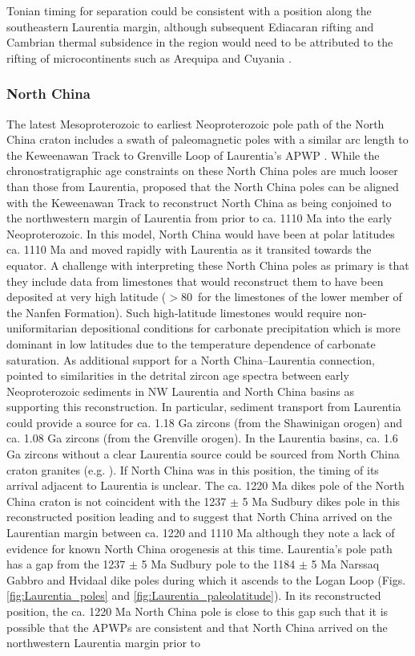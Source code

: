 \documentclass[twocolumn, switch]{article} %
\begin{document}
Tonian timing for separation could be consistent with a position along the southeastern Laurentia margin, although subsequent Ediacaran rifting and Cambrian thermal subsidence in the region would need to be attributed to the rifting of microcontinents such as Arequipa and Cuyania \citep{Escayola2011a, Martin2019a}.

\subsubsection{North China}

The latest Mesoproterozoic to earliest Neoproterozoic pole path of the North China craton includes a swath of paleomagnetic poles with a similar arc length to the Keweenawan Track to Grenville Loop of Laurentia's APWP \citep{Zhao2019a, Ding2021a, Zhang2021a}. While the chronostratigraphic age constraints on these North China poles are much looser than those from Laurentia, \cite{Zhao2019a} proposed that the North China poles can be aligned with the Keweenawan Track to reconstruct North China as being conjoined to the northwestern margin of Laurentia from prior to ca. 1110 Ma into the early Neoproterozoic. In this model, North China would have been at polar latitudes ca. 1110 Ma and moved rapidly with Laurentia as it transited towards the equator. A challenge with interpreting these North China poles as primary is that they include data from limestones that would reconstruct them to have been deposited at very high latitude ($>$80\textdegree\ for the limestones of the lower member of the Nanfen Formation). Such high-latitude limestones would require non-uniformitarian depositional conditions for carbonate precipitation which is more dominant in low latitudes due to the temperature dependence of carbonate saturation. As additional support for a North China--Laurentia connection, \cite{Zhao2019a} pointed to similarities in the detrital zircon age spectra between early Neoproterozoic sediments in NW Laurentia and North China basins as supporting this reconstruction. In particular, sediment transport from Laurentia could provide a source for ca. 1.18 Ga zircons (from the Shawinigan orogen) and ca. 1.08 Ga zircons (from the Grenville orogen). In the Laurentia basins, ca. 1.6 Ga zircons without a clear Laurentia source could be sourced from North China craton granites (e.g. \citealp{Wang2020a}). If North China was in this position, the timing of its arrival adjacent to Laurentia is unclear. The ca. 1220 Ma dikes pole of the North China craton is not coincident with the 1237 $\pm$ 5 Ma Sudbury dikes pole in this reconstructed position leading \cite{Zhao2019a} and \cite{Zhang2021a} to suggest that North China arrived on the Laurentian margin between ca. 1220 and 1110 Ma although they note a lack of evidence for known North China orogenesis at this time. Laurentia's pole path has a gap from the 1237 $\pm$ 5 Ma Sudbury pole to the 1184 $\pm$ 5 Ma Narssaq Gabbro and Hvidaal dike poles during which it ascends to the Logan Loop (Figs. \ref{fig:Laurentia_poles} and \ref{fig:Laurentia_paleolatitude}). In its reconstructed position, the ca. 1220 Ma North China pole is close to this gap such that it is possible that the APWPs are consistent and that North China arrived on the northwestern Laurentia margin prior to 
\end{document}
